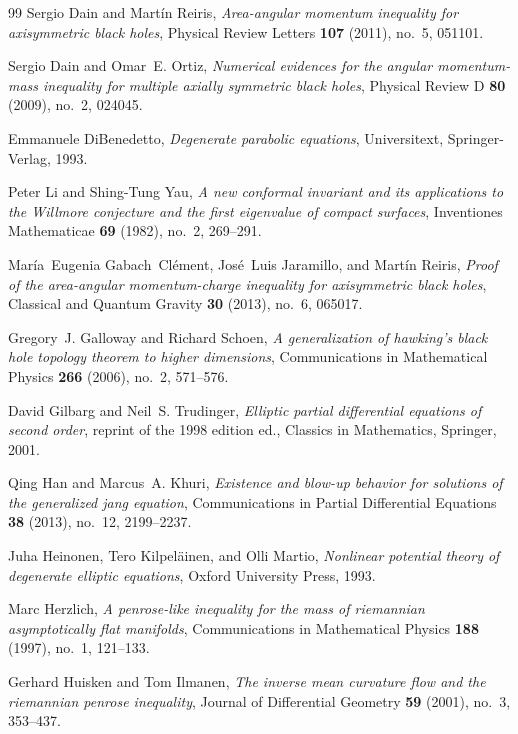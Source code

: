 \documentclass[12pt]{article}
\theoremstyle{plain}
\theoremstyle{definition}
\theoremstyle{remark}
\begin{document}
\begin{thebibliography}{99}
Sergio Dain and Mart\'in Reiris, \emph{Area-angular momentum inequality for
  axisymmetric black holes}, Physical Review Letters \textbf{107} (2011),
  no.~5, 051101.

Sergio Dain and Omar~E. Ortiz, \emph{Numerical evidences for the angular momentum-mass inequality for multiple axially symmetric black holes}, Physical Review D \textbf{80} (2009), no.~2, 024045.

Emmanuele DiBenedetto, \emph{Degenerate parabolic equations}, Universitext,
  Springer-Verlag, 1993.

Peter Li and Shing-Tung Yau, \emph{A new conformal invariant and its applications to the Willmore conjecture and the first eigenvalue of compact surfaces}, Inventiones Mathematicae \textbf{69} (1982), no.~2, 269--291.

Mar\'ia~Eugenia Gabach~Cl\'ement, Jos\'e~Luis Jaramillo, and Mart\'in Reiris,
  \emph{Proof of the area-angular momentum-charge inequality for axisymmetric
  black holes}, Classical and Quantum Gravity \textbf{30} (2013), no.~6,
  065017.

Gregory~J. Galloway and Richard Schoen, \emph{A generalization of hawking's
  black hole topology theorem to higher dimensions}, Communications in
  Mathematical Physics \textbf{266} (2006), no.~2, 571--576.

David Gilbarg and Neil~S. Trudinger, \emph{Elliptic partial differential
  equations of second order}, reprint of the 1998 edition ed., Classics in
  Mathematics, Springer, 2001.

Qing Han and Marcus~A. Khuri, \emph{Existence and blow-up behavior for
  solutions of the generalized jang equation}, Communications in Partial
  Differential Equations \textbf{38} (2013), no.~12, 2199--2237.

Juha Heinonen, Tero Kilpel\"ainen, and Olli Martio, \emph{Nonlinear potential
  theory of degenerate elliptic equations}, Oxford University Press, 1993.

Marc Herzlich, \emph{A penrose-like inequality for the mass of riemannian
  asymptotically flat manifolds}, Communications in Mathematical Physics
  \textbf{188} (1997), no.~1, 121--133.

Gerhard Huisken and Tom Ilmanen, \emph{The inverse mean curvature flow and the
  riemannian penrose inequality}, Journal of Differential Geometry \textbf{59}
  (2001), no.~3, 353--437.


\end{thebibliography}
\end{document}
